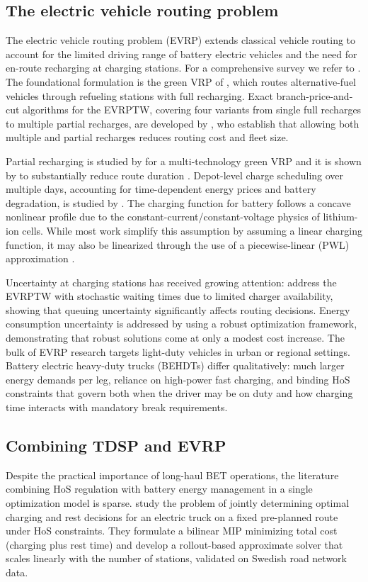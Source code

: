 \documentclass[preprint,12pt,3p]{elsarticle}
\begin{document}
\subsection{The electric vehicle routing problem}
The electric vehicle routing problem (EVRP) extends classical vehicle routing to account for the limited driving range of battery electric vehicles and the need for en-route recharging at charging stations. For a comprehensive survey we refer to \citet{erdelic_survey_2019}. The foundational formulation is the green VRP of \citet{erdogan_green_2012}, which routes alternative-fuel vehicles through refueling stations with full recharging. Exact branch-price-and-cut algorithms for the EVRPTW, covering four variants from single full recharges to multiple partial recharges, are developed by \citet{desaulniers_exact_2016}, who establish that allowing both multiple and partial recharges reduces routing cost and fleet size.

Partial recharging is studied by \citet{felipe_heuristic_2014} for a multi-technology green VRP and it is shown by \citet{keskin_partial_2016} to substantially reduce route duration . Depot-level charge scheduling over multiple days, accounting for time-dependent energy prices and battery degradation, is studied by \citet{pelletier_charge_2018}. The charging function for battery follows a concave nonlinear profile due to the constant-current/constant-voltage physics of lithium-ion cells. While most work simplify this assumption by assuming a linear charging function, it may also be linearized through the use of a piecewise-linear (PWL) approximation \citep{montoya_electric_2017}.

Uncertainty at charging stations has received growing attention: \citet{keskin_simulation-based_2021} address the EVRPTW with stochastic waiting times due to limited charger availability, showing that queuing uncertainty significantly affects routing decisions. Energy consumption uncertainty is addressed by \citet{pelletier_electric_2019} using a robust optimization framework, demonstrating that robust solutions come at only a modest cost increase. The bulk of EVRP research targets light-duty vehicles in urban or regional settings. Battery electric heavy-duty trucks (BEHDTs) differ qualitatively: much larger energy demands per leg, reliance on high-power fast charging, and binding HoS constraints that govern both when the driver may be on duty and how charging time interacts with mandatory break requirements.


\subsection{Combining TDSP and EVRP}
Despite the practical importance of long-haul BET operations, the literature combining HoS regulation with battery energy management in a single optimization model is sparse. \citet{bai_rollout-based_2023} study the problem of jointly determining optimal charging and rest decisions for an electric truck on a fixed pre-planned route under HoS constraints. They formulate a bilinear MIP minimizing total cost (charging plus rest time) and develop a rollout-based approximate solver that scales linearly with the number of stations, validated on Swedish road network data.
\end{document}
